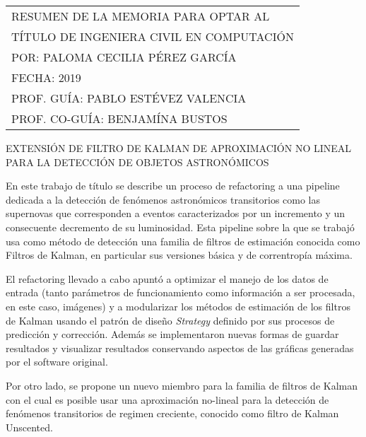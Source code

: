 

\hfill
\begin{tabular}{@{}l@{}}
\uppercase{Resumen de la memoria para optar al}\\
\uppercase{t\'itulo de ingeniera civil en computaci\'on}\\
\uppercase{Por: Paloma Cecilia P\'erez Garc\'ia}\\
\uppercase{Fecha: 2019}\\
\uppercase{Prof. Gu\'ia: Pablo Est\'evez Valencia}\\
\uppercase{Prof. Co-Gu\'ia: Benjam\'ina Bustos}\\
\end{tabular}
\bigskip

\begin{preface}
\begin{center}
\uppercase{Extensi\'on de filtro de Kalman de aproximaci\'on no lineal para la detecci\'on de objetos astronómicos}
\end{center}
En este trabajo de t\'itulo se describe un proceso de refactoring a una pipeline dedicada a la detecci\'on de fen\'omenos astron\'omicos transitorios como las supernovas que corresponden a eventos caracterizados por un incremento y un consecuente decremento de su luminosidad. Esta pipeline sobre la que se trabaj\'o usa como m\'etodo de detecci\'on una familia de filtros de estimaci\'on conocida como Filtros de Kalman, en particular sus versiones b\'asica y de correntrop\'ia m\'axima.
\bigskip

El refactoring llevado a cabo apunt\'o a optimizar el manejo de los datos de entrada (tanto par\'ametros de funcionamiento como informaci\'on a ser procesada, en este caso, im\'agenes) y a modularizar los m\'etodos de estimaci\'on de los filtros de Kalman usando el patr\'on de dise\~no \textit{Strategy} definido por sus procesos de predicci\'on y correcci\'on. Adem\'as se  implementaron nuevas formas de guardar resultados y visualizar resultados conservando aspectos de las gr\'aficas generadas por el software original. 
\bigskip

Por otro lado, se propone un nuevo miembro para la familia de filtros de Kalman con el cual es posible usar una aproximaci\'on no-lineal para la detecci\'on de fen\'omenos transitorios de regimen creciente, conocido como filtro de Kalman Unscented.




\end{preface}
